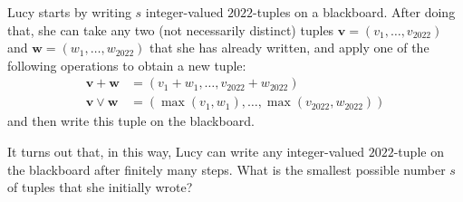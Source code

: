 Lucy starts by writing $s$ integer-valued $2022$-tuples on a blackboard. After doing that, she can take any two (not necessarily distinct) tuples $\mathbf{v} = (v_1, \ldots, v_{2022})$ and $\mathbf{w} = (w_1, \ldots, w_{2022})$ that she has already written, and apply one of the following operations to obtain a new tuple:
\[
\begin{aligned}
\mathbf{v} + \mathbf{w} &= (v_1 + w_1, \ldots, v_{2022} + w_{2022})\\
\mathbf{v} \vee \mathbf{w} &= (\max(v_1, w_1), \ldots, \max(v_{2022}, w_{2022}))
\end{aligned}
\]
and then write this tuple on the blackboard.

It turns out that, in this way, Lucy can write any integer-valued $2022$-tuple on the blackboard after finitely many steps. What is the smallest possible number $s$ of tuples that she initially wrote?
